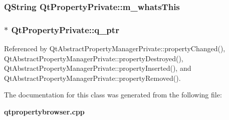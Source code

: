 \subsubsection[{m\+\_\+whats\+This}]{\setlength{\rightskip}{0pt plus 5cm}Q\+String Qt\+Property\+Private\+::m\+\_\+whats\+This}\label{classQtPropertyPrivate_a04e009f976eaa90a7edbb3a9a43fb021}
\subsubsection[{q\+\_\+ptr}]{$\ast$ Qt\+Property\+Private\+::q\+\_\+ptr}\label{classQtPropertyPrivate_a3f025785e98ba1c2113a858dda3fe3d6}


Referenced by Qt\+Abstract\+Property\+Manager\+Private\+::property\+Changed(), Qt\+Abstract\+Property\+Manager\+Private\+::property\+Destroyed(), Qt\+Abstract\+Property\+Manager\+Private\+::property\+Inserted(), and Qt\+Abstract\+Property\+Manager\+Private\+::property\+Removed().



The documentation for this class was generated from the following file\+:\begin{DoxyCompactItemize}
\item 
{\bf qtpropertybrowser.\+cpp}\end{DoxyCompactItemize}
